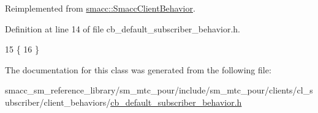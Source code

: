 Reimplemented from \hyperlink{classsmacc_1_1SmaccClientBehavior_a7962382f93987c720ad432fef55b123f}{smacc\+::\+Smacc\+Client\+Behavior}.



Definition at line 14 of file cb\+\_\+default\+\_\+subscriber\+\_\+behavior.\+h.


\begin{DoxyCode}
15     \{
16     \}
\end{DoxyCode}


The documentation for this class was generated from the following file\+:\begin{DoxyCompactItemize}
\item 
smacc\+\_\+sm\+\_\+reference\+\_\+library/sm\+\_\+mtc\+\_\+pour/include/sm\+\_\+mtc\+\_\+pour/clients/cl\+\_\+subscriber/client\+\_\+behaviors/\hyperlink{sm__mtc__pour_2include_2sm__mtc__pour_2clients_2cl__subscriber_2client__behaviors_2cb__default__subscriber__behavior_8h}{cb\+\_\+default\+\_\+subscriber\+\_\+behavior.\+h}\end{DoxyCompactItemize}

